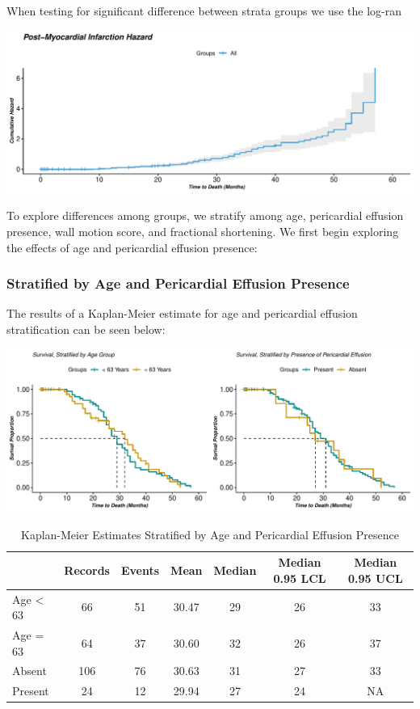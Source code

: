 \documentclass[
]{article}
\begin{document}
When testing for significant difference between strata groups we use the
log-ran

\begin{center}\includegraphics{markdown_files/figure-latex/kmhaz.all-1} \end{center}

To explore differences among groups, we stratify among age, pericardial
effusion presence, wall motion score, and fractional shortening. We
first begin exploring the effects of age and pericardial effusion
presence:

\hypertarget{stratified-by-age-and-pericardial-effusion-presence}{%
\subsubsection{Stratified by Age and Pericardial Effusion
Presence}\label{stratified-by-age-and-pericardial-effusion-presence}}

The results of a Kaplan-Meier estimate for age and pericardial effusion
stratification can be seen below:

\begin{center}\includegraphics{markdown_files/figure-latex/km.age.effusion-1} \end{center}

\begin{table}[!h]

\caption{\label{tab:ks2}Kaplan-Meier Estimates Stratified by Age and Pericardial Effusion Presence}
\centering
\begin{tabular}[t]{l|c|c|c|c|c|c}
\hline
  & Records & Events & Mean & Median & Median 0.95 LCL & Median 0.95 UCL\\
\hline
Age < 63 & 66 & 51 & 30.47 & 29 & 26 & 33\\
\hline
Age = 63 & 64 & 37 & 30.60 & 32 & 26 & 37\\
\hline
Absent & 106 & 76 & 30.63 & 31 & 27 & 33\\
\hline
Present & 24 & 12 & 29.94 & 27 & 24 & NA\\
\hline
\end{tabular}
\end{table}
\end{document}
